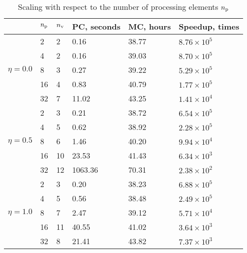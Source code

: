 \begin{table}[h]
  \vspace{-0.5em}
  \centering
  \caption{Scaling with respect to the number of processing elements \textnormal{${n_\text{p}}$}}
  \vspace{-0.5em}
  \begin{tabular*}{1\linewidth}{cL{10pt}L{10pt}R{45pt}R{45pt}R{60pt}}
    \toprule
    & ${n_\text{p}}$ & ${n_\text{v}}$ & PC, seconds & MC, hours & Speedup, times \\
    \midrule
    \midrule
    &  2 & 2 &  0.16 & 38.77 & $8.76 \times 10^5$ \\
    &  4 & 2 &  0.16 & 39.03 & $8.70 \times 10^5$ \\
    &  8 & 3 &  0.27 & 39.22 & $5.29 \times 10^5$ \\
    & 16 & 4 &  0.83 & 40.79 & $1.77 \times 10^5$ \\
    & 32 & 7 & 11.02 & 43.25 & $1.41 \times 10^4$ \\
    \midrule
    &  2 &  3 &    0.21 & 38.72 & $6.54 \times 10^5$ \\
    &  4 &  5 &    0.62 & 38.92 & $2.28 \times 10^5$ \\
    &  8 &  6 &    1.46 & 40.20 & $9.94 \times 10^4$ \\
    & 16 & 10 &   23.53 & 41.43 & $6.34 \times 10^3$ \\
    & 32 & 12 & 1063.36 & 70.31 & $2.38 \times 10^2$ \\
    \midrule
    &  2 &  3 &  0.20 & 38.23 & $6.88 \times 10^5$ \\
    &  4 &  5 &  0.56 & 38.48 & $2.49 \times 10^5$ \\
    &  8 &  7 &  2.47 & 39.12 & $5.71 \times 10^4$ \\
    & 16 & 11 & 40.55 & 41.02 & $3.64 \times 10^3$ \\
    & 32 &  8 & 21.41 & 43.82 & $7.37 \times 10^3$ \\
    \bottomrule
  \end{tabular*}
  \vspace{-0.5em}
\end{table}
